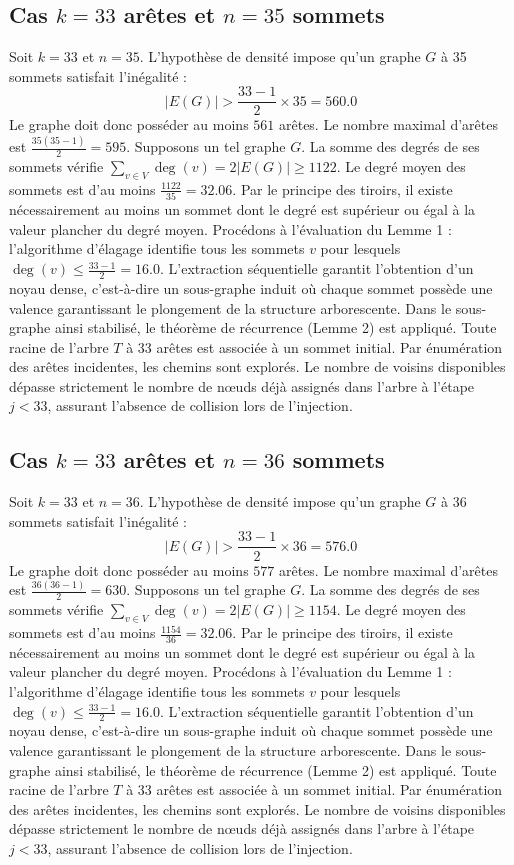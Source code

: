 \documentclass[12pt,a4paper]{article}
\begin{document}
\subsection{Cas $k = 33$ arêtes et $n = 35$ sommets}
Soit $k = 33$ et $n = 35$. L'hypothèse de densité impose qu'un graphe $G$ à 35 sommets satisfait l'inégalité :
$$ |E(G)| > \frac{33-1}{2} \times 35 = 560.0 $$
Le graphe doit donc posséder au moins $561$ arêtes. Le nombre maximal d'arêtes est $\frac{35(35-1)}{2} = 595$.
Supposons un tel graphe $G$. La somme des degrés de ses sommets vérifie $\sum_{v \in V} \deg(v) = 2|E(G)| \geq 1122$.
Le degré moyen des sommets est d'au moins $\frac{1122}{35} = 32.06$.
Par le principe des tiroirs, il existe nécessairement au moins un sommet dont le degré est supérieur ou égal à la valeur plancher du degré moyen.
Procédons à l'évaluation du Lemme 1 : l'algorithme d'élagage identifie tous les sommets $v$ pour lesquels $\deg(v) \leq \frac{33-1}{2} = 16.0$.
L'extraction séquentielle garantit l'obtention d'un noyau dense, c'est-à-dire un sous-graphe induit où chaque sommet possède une valence garantissant le plongement de la structure arborescente.
Dans le sous-graphe ainsi stabilisé, le théorème de récurrence (Lemme 2) est appliqué. Toute racine de l'arbre $T$ à 33 arêtes est associée à un sommet initial. Par énumération des arêtes incidentes, les chemins sont explorés. Le nombre de voisins disponibles dépasse strictement le nombre de nœuds déjà assignés dans l'arbre à l'étape $j < 33$, assurant l'absence de collision lors de l'injection.

\subsection{Cas $k = 33$ arêtes et $n = 36$ sommets}
Soit $k = 33$ et $n = 36$. L'hypothèse de densité impose qu'un graphe $G$ à 36 sommets satisfait l'inégalité :
$$ |E(G)| > \frac{33-1}{2} \times 36 = 576.0 $$
Le graphe doit donc posséder au moins $577$ arêtes. Le nombre maximal d'arêtes est $\frac{36(36-1)}{2} = 630$.
Supposons un tel graphe $G$. La somme des degrés de ses sommets vérifie $\sum_{v \in V} \deg(v) = 2|E(G)| \geq 1154$.
Le degré moyen des sommets est d'au moins $\frac{1154}{36} = 32.06$.
Par le principe des tiroirs, il existe nécessairement au moins un sommet dont le degré est supérieur ou égal à la valeur plancher du degré moyen.
Procédons à l'évaluation du Lemme 1 : l'algorithme d'élagage identifie tous les sommets $v$ pour lesquels $\deg(v) \leq \frac{33-1}{2} = 16.0$.
L'extraction séquentielle garantit l'obtention d'un noyau dense, c'est-à-dire un sous-graphe induit où chaque sommet possède une valence garantissant le plongement de la structure arborescente.
Dans le sous-graphe ainsi stabilisé, le théorème de récurrence (Lemme 2) est appliqué. Toute racine de l'arbre $T$ à 33 arêtes est associée à un sommet initial. Par énumération des arêtes incidentes, les chemins sont explorés. Le nombre de voisins disponibles dépasse strictement le nombre de nœuds déjà assignés dans l'arbre à l'étape $j < 33$, assurant l'absence de collision lors de l'injection.
\end{document}

